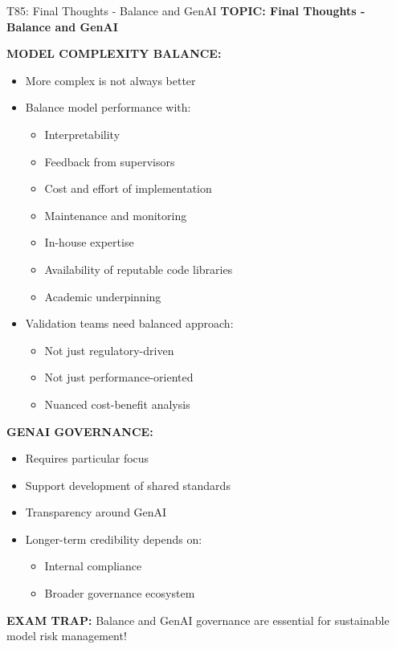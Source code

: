 \documentclass[8pt]{beamer}
\begin{document}
	\begin{frame}{T85: Final Thoughts - Balance and GenAI}
		\fontsize{6.5}{7.5}\selectfont
		\textbf{TOPIC: Final Thoughts - Balance and GenAI}
		
		\vspace{0.1cm}
		\textbf{MODEL COMPLEXITY BALANCE:}
		\begin{itemize}
			\item More complex is not always better
			\item Balance model performance with:
			\begin{itemize}
				\item Interpretability
				\item Feedback from supervisors
				\item Cost and effort of implementation
				\item Maintenance and monitoring
				\item In-house expertise
				\item Availability of reputable code libraries
				\item Academic underpinning
			\end{itemize}
			\item Validation teams need balanced approach:
			\begin{itemize}
				\item Not just regulatory-driven
				\item Not just performance-oriented
				\item Nuanced cost-benefit analysis
			\end{itemize}
		\end{itemize}
		
		\vspace{0.1cm}
		\textbf{GENAI GOVERNANCE:}
		\begin{itemize}
			\item Requires particular focus
			\item Support development of shared standards
			\item Transparency around GenAI
			\item Longer-term credibility depends on:
			\begin{itemize}
				\item Internal compliance
				\item Broader governance ecosystem
			\end{itemize}
		\end{itemize}
		
		\textcolor{myred}{\textbf{EXAM TRAP:}} Balance and GenAI governance are \textcolor{myblue}{essential for sustainable model risk management}!
	\end{frame}
	
\end{document}
